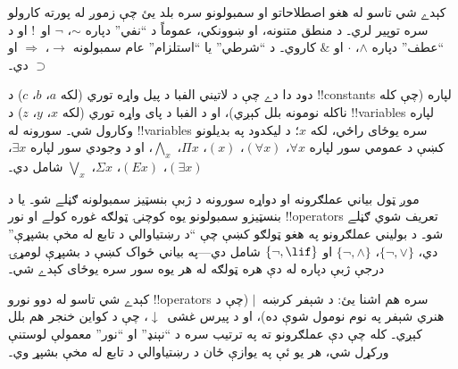\documentclass[../../../include/open-logic-section]{subfiles}
\begin{document}

\begin{intro}
کېدے شي تاسو له هغو اصطلاحاتو او سمبولونو سره بلد يئ چې زموږ له پورته
کارولو سره توپير لري۔ د منطق متنونه، او ښوونکي، عموماً د ``نفي''
دپاره $\sim$، $\neg$ او~!\، او د ``عطف'' دپاره $\wedge$، $\cdot$ او
$\&$ کاروي۔ د ``شرطي'' يا ``استلزام'' عام سمبولونه $\rightarrow$،
$\Rightarrow$ او $\supset$ دي۔

دود دا دے چې د لاتيني الفبا د پيل واړه توري (لکه $a$، $b$، $c$) د
!!{constant}s لپاره (چې کله ناکله نومونه بلل کېږي)، او د الفبا د پای
واړه توري (لکه $x$، $y$، $z$) د !!{variable}s لپاره وکارول شي۔ سورونه
له !!{variable}s سره يوځای راځي، لکه $x$؛ د ليکدود په بديلونو کښې د
عمومي سور لپاره $\forall x$، $(\forall x)$، $(x)$، $\Pi x$،
$\bigwedge_x$، او د وجودي سور لپاره $\exists x$، $(\exists
x)$، $(Ex)$، $\Sigma x$، $\bigvee_x$ شامل دي۔
\end{intro}

\begin{explain}
موږ ټول بياني عملګرونه او دواړه سورونه د ژبې بنسټيز سمبولونه ګڼلے شو۔
يا د بنسټيزو سمبولونو يوه کوچنۍ ټولګه غوره کولے او نور !!{operator}s
تعريف شوي ګڼلے شو۔ د بوليني عملګرونو په هغو ټولګو کښې چې ``د رښتياوالي
د تابع له مخې بشپړې'' دي، $\{ \lnot, \lor \}$، $\{ \lnot, \land \}$
او $\{ \lnot, \lif\}$ شامل دي---په بياني ځواک کښې د بشپړې لومړۍ
درجې ژبې دپاره له دې هره ټولګه له هر يوه سور سره يوځای کېدے شي۔

کېدے شي تاسو له دوو نورو !!{operator}s سره هم اشنا يئ: د شېفر
کرښه~$|$ (چې د هنري شېفر په نوم نومول شوې ده)، او د پيرس
غشی~$\downarrow$، چې د کواین خنجر هم بلل کېږي۔ کله چې دې عملګرونو ته په
ترتيب سره د ``نېنډ'' او ``نور'' معمولې لوستنې ورکړل شي، هر يو ئې په
يوازې ځان د رښتياوالي د تابع له مخې بشپړ وي۔
\end{explain}
\end{document}
